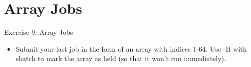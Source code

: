 \documentclass[handout]{beamer} %
\begin{document}
{
\section{Array Jobs}
%
\begin{frame}{Exercise 9: Array Jobs}
\begin{itemize}
\item{Submit your last job in the form of an array with indices 1-64. Use -H with sbatch to mark the array as held (so that it won't run immediately).}
\end{itemize}
\end{frame}
}
\end{document}
